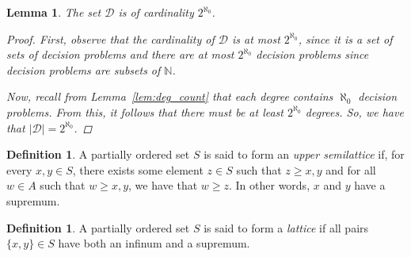 \documentclass[psamsfonts]{amsart}
\newtheorem{lem}[thm]{Lemma}
\theoremstyle{definition}
\newtheorem{defn}[thm]{Definition}
\theoremstyle{remark}
\numberwithin{equation}{section}
\begin{document}
\begin{lem}
  The set $\mathcal{D}$ is of cardinality $2^{\aleph_0}$.
  \begin{proof}
    First, observe that the cardinality of $\mathcal{D}$ is at most
    $2^{\aleph_0}$, since it is a set of sets of decision problems and there are
    at most $2^{\aleph_0}$ decision problems since decision problems are subsets
    of $\mathbb{N}$.\par Now, recall from Lemma~\ref{lem:deg_count} that each
    degree contains $\aleph_0$ decision problems. From this, it follows that
    there must be at least $2^{\aleph_0}$ degrees. So, we have that $\lvert \mathcal{D} \rvert=2^{\aleph_0}$.
  \end{proof}
\end{lem}

\begin{defn}
  A partially ordered set $S$ is said to form an \emph{upper semilattice} if, for every
 $x,y\in S$, there exists some element $z\in S$ such that $z \geq x,y$ and
 for all $w\in A$ such that $w\geq x,y$, we have that $w \geq z$. In other
 words, $x$ and $y$ have a supremum.
\end{defn}

\begin{defn}
  A partially ordered set $S$ is said to form a \emph{lattice} if all pairs
  $\{x,y\}\in S$ have both an infinum and a supremum.
\end{defn}
\end{document}
